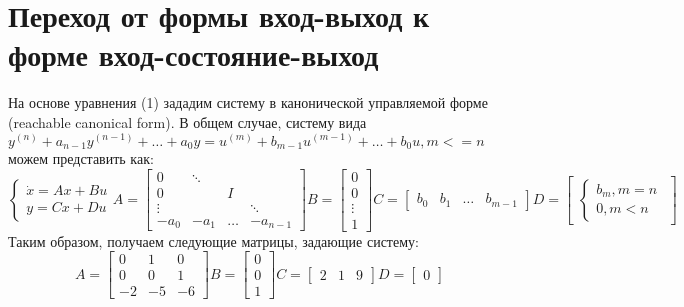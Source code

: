 \section{Переход от формы вход-выход к форме вход-состояние-выход}
На основе уравнения (1) зададим систему в канонической управляемой форме (reachable canonical form). В общем случае,
 систему вида $y^{(n)} + a_{n-1}y^{(n-1)} + \dots +a_0y = u^{(m)} + b_{m-1}u^{(m-1)} + \dots +b_0u, m <= n$ можем 
представить как:
\begin{equation}
    \begin{cases}
        \dot x = Ax + Bu \\
        y = Cx + Du
    \end{cases}
    A = \begin{bmatrix}
        0 & \ddots &  &  \\
        0 &  & I &  \\
        \vdots &  &  & \ddots \\
        -a_0 & -a_1 & \hdots & -a_{n-1} 
        \end{bmatrix}
        B = \begin{bmatrix}
            0 \\
            0 \\
            \vdots \\
            1
            \end{bmatrix}
        C = \begin{bmatrix}
            b_0 & b_1 & \hdots & b_{m-1}
            \end{bmatrix}
        D = \begin{bmatrix}
            \begin{cases}
                b_m, m = n \\
                0, m < n
            \end{cases}
            \end{bmatrix}
\end{equation}
Таким образом, получаем следующие матрицы, задающие систему:
\begin{equation*}
    A = \begin{bmatrix}
        0 & 1 &  0   \\
        0 &  0 & 1  \\
        -2 & -5 &  -6 
        \end{bmatrix}
        B = \begin{bmatrix}
            0  \\
            0 \\
            1
            \end{bmatrix}
        C = \begin{bmatrix}
            2 & 1 & 9
            \end{bmatrix}
        D = \begin{bmatrix}
             0
            \end{bmatrix}
\end{equation*}

